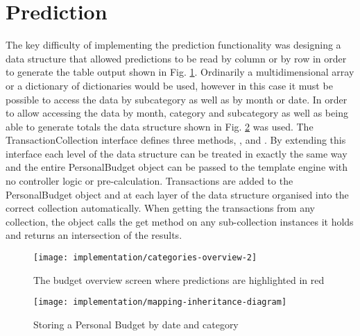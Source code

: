 \section{Prediction} \label{section:prediction-implementation}
The key difficulty of implementing the prediction functionality was designing a data structure that allowed predictions to be read by column or by row in order to generate the table output shown in Fig. \ref{fig:imp-categories-overview}. Ordinarily a multidimensional array or a dictionary of dictionaries would be used, however in this case it must be possible to access the data by subcategory as well as by month or date.
%
In order to allow accessing the data by month, category and subcategory as well as being able to generate totals the data structure shown in Fig. \ref{fig:prediction-inheritance-diagram} was used. The TransactionCollection interface defines three methods, ,  and . By extending this interface each level of the data structure can be treated in exactly the same way and the entire PersonalBudget object can be passed to the template engine with no controller logic or pre-calculation. Transactions are added to the PersonalBudget object and at each layer of the data structure organised into the correct collection automatically. When getting the transactions from any collection, the object calls the get  method on any sub-collection instances it holds and returns an intersection of the results.

\begin{figure}[h]
    \centering
    \texttt{[image: implementation/categories-overview-2]}
    \caption{The budget overview screen where predictions are highlighted in red}
    \label{fig:imp-categories-overview}
\end{figure}

\begin{figure}[h]
    \centering
    \texttt{[image: implementation/mapping-inheritance-diagram]}
    \caption{Storing a Personal Budget by date and category}
    \label{fig:prediction-inheritance-diagram}
    
    \begin{comment}
[PersonalBudget]<>1-2>[Budget]
[<<Abstract>> CategoryCollection]^-[Budget]
[<<Interface>>;TransactionCollection]^-[Budget]
[<<Abstract>>;CategoryCollection]^-[TransactionDateCollection]
[<<Interface>>;TransactionCollection]^-[TransactionDateCollection]
[Budget]<>1-0..*>[TransactionDateCollection]
[<<Abstract>>;CategoryCollection]^-[TransactionCategoryCollection]
[<<Interface>>;TransactionCollection]^-[TransactionCategoryCollection]
[TransactionDateCollection]<>1-0..*>[TransactionCategoryCollection]
[<<Abstract>>;CategoryCollection]^-[TransactionSubCategoryCollection]
[<<Interface>>;TransactionCollection]^-[TransactionSubCategoryCollection]
[TransactionCategoryCollection]<>1-0..*>[TransactionSubCategoryCollection]
[TransactionSubCategoryCollection]<>1-0..*>[Transaction]
    \end{comment}
\end{figure}

